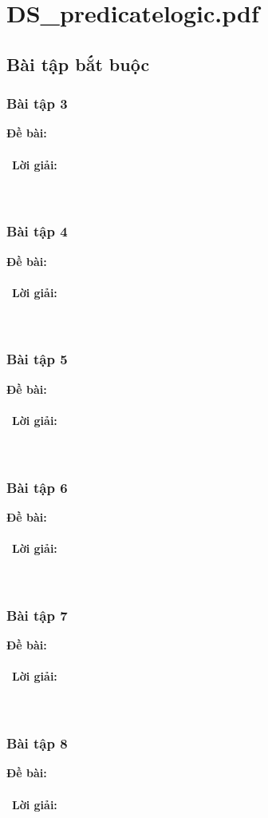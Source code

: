 \documentclass[a4paper]{article}
\begin{document}
\section{DS\_predicatelogic.pdf}
\subsection{Bài tập bắt buộc}
\subsubsection{Bài tập 3}
\textbf{Đề bài:} 
\\\ \\\
\textbf{Lời giải:} \\\ \\\
\clearpage
\subsubsection{Bài tập 4}
\textbf{Đề bài:} 
\\\ \\\
\textbf{Lời giải:} \\\ \\\
\clearpage
\subsubsection{Bài tập 5}
\textbf{Đề bài:} 
\\\ \\\
\textbf{Lời giải:} \\\ \\\
\clearpage
\subsubsection{Bài tập 6}
\textbf{Đề bài:} 
\\\ \\\
\textbf{Lời giải:} \\\ \\\
\clearpage
\subsubsection{Bài tập 7}
\textbf{Đề bài:} 
\\\ \\\
\textbf{Lời giải:} \\\ \\\
\clearpage
\subsubsection{Bài tập 8}
\textbf{Đề bài:} 
\\\ \\\
\textbf{Lời giải:} \\\ \\\
\clearpage
\end{document}
